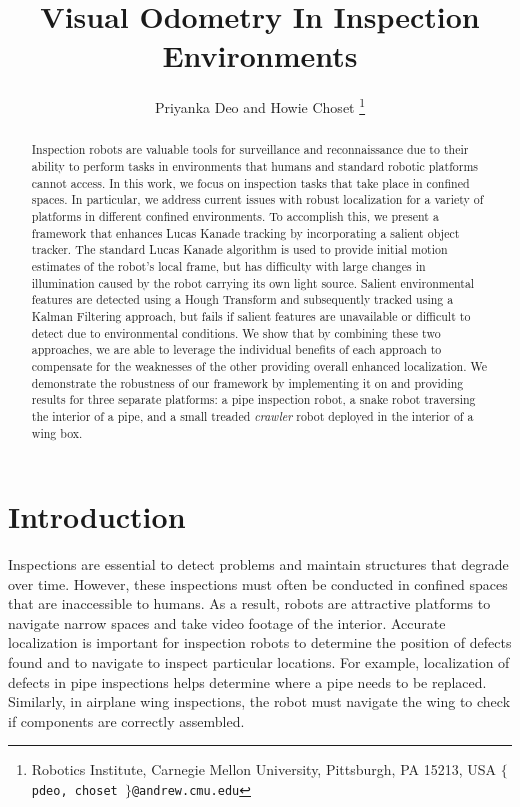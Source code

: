 \documentclass[letterpaper, 10 pt, conference]{ieeeconf}
\title{\LARGE \bf Visual Odometry In Inspection Environments}
\author{Priyanka Deo and Howie Choset%
\thanks{Robotics Institute,
Carnegie Mellon University,
Pittsburgh, PA 15213, USA
{\tt\small $\lbrace$ pdeo, choset $\rbrace$@andrew.cmu.edu}}%
}
\begin{document}
\maketitle
\thispagestyle{empty}
\pagestyle{empty}


\begin{abstract}

Inspection robots are valuable tools for surveillance and reconnaissance due to their ability to perform tasks in environments that humans and standard robotic platforms cannot access. In this work, we focus on inspection tasks that take place in confined spaces. In particular, we address current issues with robust localization for a variety of platforms in different confined environments. To accomplish this, we present a framework that enhances Lucas Kanade tracking by incorporating a salient object tracker. The standard Lucas Kanade algorithm is used to provide initial motion estimates of the robot's local frame, but has difficulty with large changes in illumination caused by the robot carrying its own light source. Salient environmental features are detected using a Hough Transform and subsequently tracked using a Kalman Filtering approach, but fails if salient features are unavailable or difficult to detect due to environmental conditions. We show that by combining these two approaches, we are able to leverage the individual benefits of each approach to compensate for the weaknesses of the other providing overall enhanced localization. We demonstrate the robustness of our framework by implementing it on and providing results for three separate platforms: a pipe inspection robot, a snake robot traversing the interior of a pipe, and a small treaded \emph{crawler} robot deployed in the interior of a wing box.

\end{abstract}


\section{Introduction}

Inspections are essential to detect problems and maintain structures that degrade over time. However, these inspections must often be conducted in confined spaces that are inaccessible to humans. As a result, robots are attractive platforms to navigate narrow spaces and take video footage of the interior. Accurate localization is important for inspection robots to determine the position of defects found and to navigate to inspect particular locations. For example, localization of defects in pipe inspections helps determine where a pipe needs to be replaced. Similarly, in airplane wing inspections, the robot must navigate the wing to check if components are correctly assembled. 
\end{document}
